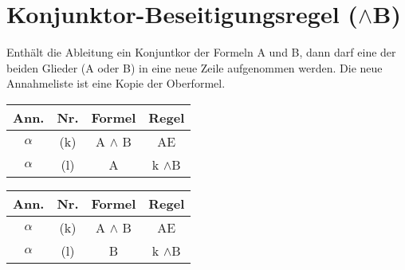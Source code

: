 \documentclass{sajzk}
\begin{document}
\section{Konjunktor-Beseitigungsregel \texorpdfstring{($\land$B)}{(and B)}}
\label{4k16}
Enthält die Ableitung ein Konjuntkor der Formeln A und B, dann darf eine der
beiden Glieder (A oder B) in eine neue Zeile aufgenommen werden. Die neue
Annahmeliste ist eine Kopie der Oberformel.

\begin{center}
  \begin{minipage}[t]{0.4\textwidth}
    \begin{tabular}{|c|c|c|c|}
      \hline
      Ann.               & Nr.    & Formel       & Regel \\
      \hline
      $\alpha$           & (k)    & A $\land$ B  & AE \\
      \hline
      $\alpha$           & (l)    & A            & k $\land$B \\
      \hline
    \end{tabular}
  \end{minipage}
  \begin{minipage}[t]{0.4\textwidth}
    \begin{tabular}{|c|c|c|c|}
      \hline
      Ann.               & Nr.    & Formel       & Regel \\
      \hline
      $\alpha$           & (k)    & A $\land$ B  & AE \\
      \hline
      $\alpha$           & (l)    & B            & k $\land$B \\
      \hline
    \end{tabular}
  \end{minipage}
\end{center}
\end{document}

